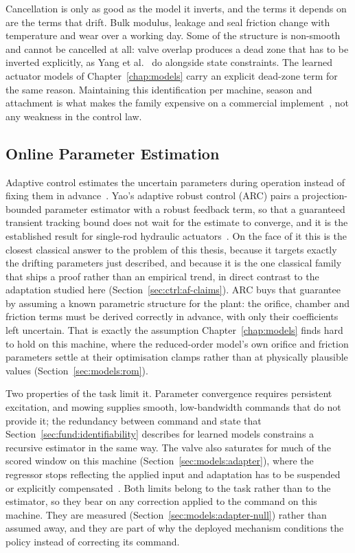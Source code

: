 Cancellation is only as good as the model it inverts, and the terms it depends
on are the terms that drift. Bulk modulus, leakage and seal friction change
with temperature and wear over a working day. Some of the structure is
non-smooth and cannot be cancelled at all: valve overlap produces a dead zone
that has to be inverted explicitly, as Yang et
al.~\cite{yang2026stateconstrained} do alongside state constraints. The learned
actuator models of Chapter~\ref{chap:models} carry an explicit dead-zone term
for the same reason. Maintaining this identification per machine, season and
attachment is what makes the family expensive on a commercial
implement~\cite{mattila2017survey}, not any weakness in the control law.

\subsection{Online Parameter Estimation}

Adaptive control estimates the uncertain parameters during operation instead of
fixing them in advance~\cite{astrom1995adaptive}. Yao's adaptive robust control
(ARC) pairs a projection-bounded parameter estimator with a robust feedback
term, so that a guaranteed transient tracking bound does not wait for the
estimate to converge, and it is the established result for single-rod
hydraulic actuators~\cite{yao2000adaptive}. On the face of it this is the
closest classical answer to the problem of this thesis, because it targets
exactly the drifting parameters just described, and because it is the one
classical family that ships a proof rather than an empirical trend, in direct
contrast to the adaptation studied here (Section~\ref{sec:ctrl:af-claims}). ARC
buys that guarantee by assuming a known parametric structure for the plant: the
orifice, chamber and friction terms must be derived correctly in advance, with
only their coefficients left uncertain. That is exactly the assumption
Chapter~\ref{chap:models} finds hard to hold on this machine, where the
reduced-order model's own orifice and friction parameters settle at their
optimisation clamps rather than at physically plausible values
(Section~\ref{sec:models:rom}).

Two properties of the task limit it. Parameter convergence requires persistent
excitation, and mowing supplies smooth, low-bandwidth commands that do not
provide it; the redundancy between command and state that
Section~\ref{sec:fund:identifiability} describes for learned models constrains
a recursive estimator in the same way. The valve also saturates for much of the
scored window on this machine (Section~\ref{sec:models:adapter}), where the
regressor stops reflecting the applied input and adaptation has to be suspended
or explicitly compensated~\cite{sofrony2024antiwindup}. Both limits belong to
the task rather than to the estimator, so they bear on any correction applied to
the command on this machine. They are measured
(Section~\ref{sec:models:adapter-null}) rather than assumed away, and they are
part of why the deployed mechanism conditions the policy instead of correcting
its command.

